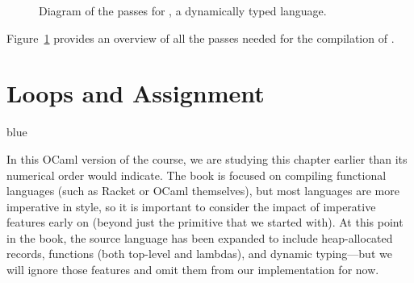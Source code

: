 \documentclass[11pt]{book}
\newenvironment{ocamlx}{
  \begin{color}{blue}
}
{
  \end{color}
}
\begin{document}
\begin{figure}[p]
  \caption{Diagram of the passes for \LangDyn{}, a dynamically typed language.}
\label{fig:Rdyn-passes}
\end{figure}

Figure~\ref{fig:Rdyn-passes} provides an overview of all the passes needed
for the compilation of \LangDyn{}.


\chapter{Loops and Assignment}
\label{ch:Rwhile}



\begin{ocamlx}
In this OCaml version of the course, we are studying this chapter
  earlier than its numerical order would indicate. The book is focused on
  compiling functional languages (such as Racket or OCaml themselves), but
  most languages are more imperative in style, so it is important to
  consider the impact of imperative features early on (beyond just the
   primitive that we started with). At this point in the book,
  the source language has been expanded to include heap-allocated records,
  functions (both top-level and lambdas), and dynamic typing---but we will ignore
  those features and omit them from our implementation for now.
\end{ocamlx}
\end{document}
